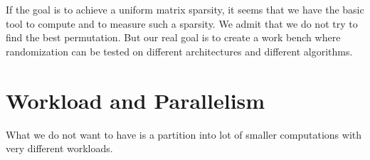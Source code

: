 \documentclass[manuscript,screen]{acmart}
\begin{document}

If the goal is to achieve a uniform matrix sparsity, it seems that we
have the basic tool to compute and to measure such a sparsity. We
admit that we do not try to find the best permutation. But our real
goal is to create a work bench where randomization can be tested on
different architectures and different algorithms.


\section{Workload and Parallelism}
\label{sec:workload}

What we do not want to have is a partition into lot of smaller
computations with very different workloads. 
\end{document}
